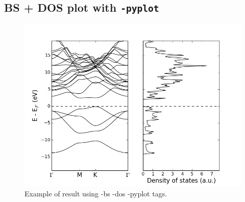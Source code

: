\documentclass{refart}
\begin{document}
\subsection{BS + DOS plot with \texttt{-pyplot}}


\begin{figure}[h!]
\centering
\includegraphics[width=.9\linewidth]{img/bsdos.png}
\caption{Example of result using -bs -dos -pyplot tags.}
\label{fig:bsdos_pyplot}
\end{figure}
\end{document}
